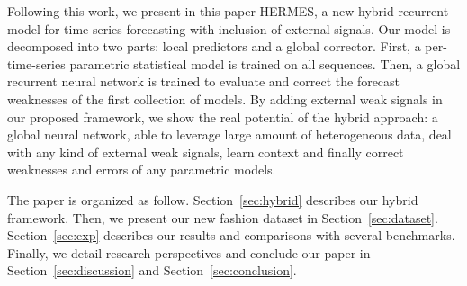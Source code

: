 \documentclass{article} %
\begin{document}

Following this work, we present in this paper HERMES, a new hybrid recurrent model for time series forecasting with inclusion of external signals. Our model is decomposed  into two parts: local predictors and a global corrector.  First, a per-time-series parametric statistical model is trained on all sequences. Then,  a global recurrent neural network is trained to evaluate and correct the forecast weaknesses of the first collection of models. By adding external weak signals in our proposed framework, we show the real potential of the hybrid approach: a global neural network, able to leverage large amount of heterogeneous data, deal with any kind of external weak signals, learn context and finally correct weaknesses and errors of any parametric models.



The paper is organized as follow. Section~\ref{sec:hybrid} describes our hybrid framework. Then, we present our new fashion dataset in Section~\ref{sec:dataset}. Section~\ref{sec:exp} describes our results and comparisons with several benchmarks. Finally, we detail research perspectives and conclude our paper in Section~\ref{sec:discussion} and Section~\ref{sec:conclusion}.
\end{document}
